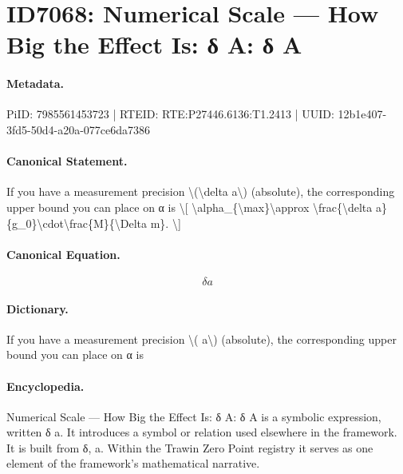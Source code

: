 \section*{ID7068: Numerical Scale — How Big the Effect Is: δ A: δ A}
\paragraph{Metadata.}
PiID: 7985561453723 | RTEID: RTE:P27446.6136:T1.2413 | UUID: 12b1e407-3fd5-50d4-a20a-077ce6da7386

\paragraph{Canonical Statement.}
If you have a measurement precision \textbackslash{}(\textbackslash{}delta a\textbackslash{}) (absolute), the corresponding upper bound you can place on α is \textbackslash{}[ \textbackslash{}alpha\_\{\textbackslash{}max\}\textbackslash{}approx \textbackslash{}frac\{\textbackslash{}delta a\}\{g\_0\}\textbackslash{}cdot\textbackslash{}frac\{M\}\{\textbackslash{}Delta m\}. \textbackslash{}]

\paragraph{Canonical Equation.}
\[
\delta a
\]

\paragraph{Dictionary.}
If you have a measurement precision \textbackslash{}( a\textbackslash{}) (absolute), the corresponding upper bound you can place on α is

\paragraph{Encyclopedia.}
Numerical Scale — How Big the Effect Is: δ A: δ A is a symbolic expression, written δ a. It introduces a symbol or relation used elsewhere in the framework. It is built from δ, a. Within the Trawin Zero Point registry it serves as one element of the framework's mathematical narrative.
